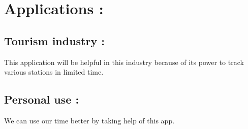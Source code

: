 \documentclass[12pt]{IEEEtran}
\begin{document}
\section{Applications :}
  \subsection{Tourism industry :}
  This application will be helpful in this industry because of its power to track various stations in limited time.
  \subsection{Personal use :}
  We can use our time better by taking help of this app.
  
  
  


 
\end{document}
